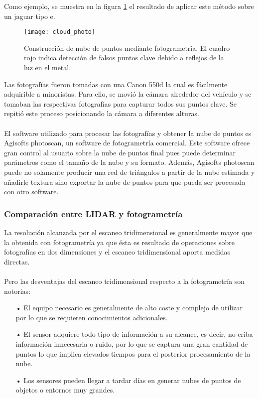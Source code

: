 Como ejemplo, se muestra en la figura \ref{fig:cloud_photo} el resultado de aplicar este método sobre un jaguar tipo e\cite{fotogrametria}. 
\begin{figure}
\centering
{}
  \texttt{[image: cloud\_photo]}
  \caption{Construcción de nube de puntos mediante fotogrametría. El cuadro rojo indica detección de falsos puntos clave debido a reflejos de la luz en el metal.}\label{fig:cloud_photo}
\endminipage\hfill
\end{figure}
Las fotografías fueron tomadas con una Canon 550d\cite{canon} la cual es fácilmente adquirible a minoristas. Para ello, se movió la cámara alrededor del vehículo y se tomaban las respectivas fotografías para capturar todos sus puntos clave. Se repitió este proceso posicionando la cámara a diferentes alturas.
\\
\\
El software utilizado para procesar las fotografías y obtener la nube de puntos es Agisofts photoscan\cite{agisoft}, un software de fotogrametría comercial. Este software ofrece gran control al usuario sobre la nube de puntos final pues puede determinar parámetros como el tamaño de la nube y su formato. Además, Agisofts photoscan puede no solamente producir una red de triángulos a partir de la nube estimada y añadirle textura sino exportar la nube de puntos para que pueda ser procesada con otro software.



\subsubsection{Comparación entre LIDAR y fotogrametría}
La resolución alcanzada por el escaneo tridimensional es generalmente mayor que la obtenida con fotogrametría ya que ésta es resultado de operaciones sobre fotografías en dos dimensiones y el escaneo tridimensional aporta medidas directas.
\\
\\
Pero las desventajas del escaneo tridimensional respecto a la fotogrametría son notorias:
\begin{itemize}
\item[•] El equipo necesario es generalmente de alto coste y complejo de utilizar por lo que se requieren conocimientos adicionales. 
\item[•] El sensor adquiere todo tipo de información a su alcance, es decir, no criba información innecesaria o ruido, por lo que se captura una gran cantidad de puntos lo que implica elevados tiempos para el posterior procesamiento de la nube.
\item[•] Los sensores pueden llegar a tardar días en generar nubes de puntos de objetos o entornos muy grandes.
\end{itemize}   


